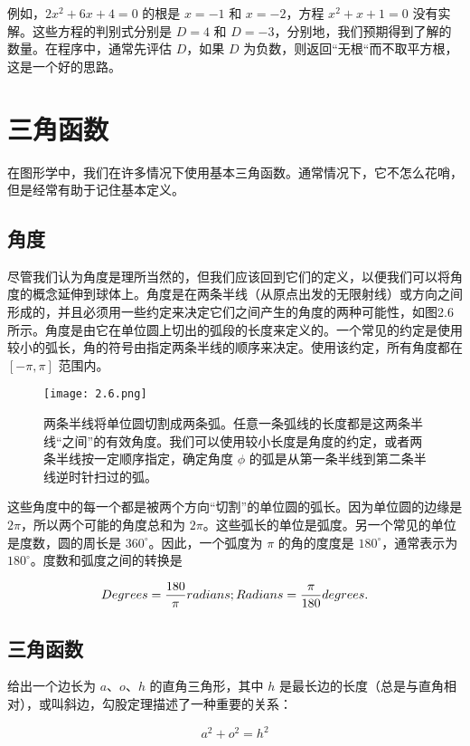\documentclass[lang=cn,10pt]{elegantbook}
\begin{document}
例如，$2x^2+6x+4=0$ 的根是 $x=-1$ 和 $x=-2$，方程 $x^2+x+1=0$ 没有实解。这些方程的判别式分别是 $D=4$ 和 $D=-3$，分别地，我们预期得到了解的数量。在程序中，通常先评估 $D$，如果 $D$ 为负数，则返回``无根“而不取平方根，这是一个好的思路。

\section{三角函数}

在图形学中，我们在许多情况下使用基本三角函数。通常情况下，它不怎么花哨，但是经常有助于记住基本定义。

\subsection{角度}

尽管我们认为角度是理所当然的，但我们应该回到它们的定义，以便我们可以将角度的概念延伸到球体上。角度是在两条半线（从原点出发的无限射线）或方向之间形成的，并且必须用一些约定来决定它们之间产生的角度的两种可能性，如图2.6所示。角度是由它在单位圆上切出的弧段的长度来定义的。一个常见的约定是使用较小的弧长，角的符号由指定两条半线的顺序来决定。使用该约定，所有角度都在 $[-\pi, \pi]$ 范围内。

\begin{figure}[htbp]
\centering
\texttt{[image: 2.6.png]}
\caption{两条半线将单位圆切割成两条弧。任意一条弧线的长度都是这两条半线“之间”的有效角度。我们可以使用较小长度是角度的约定，或者两条半线按一定顺序指定，确定角度 $\phi$ 的弧是从第一条半线到第二条半线逆时针扫过的弧。}
\end{figure}

这些角度中的每一个都是被两个方向“切割”的单位圆的弧长。因为单位圆的边缘是 $2\pi$，所以两个可能的角度总和为 $2\pi$。这些弧长的单位是弧度。另一个常见的单位是度数，圆的周长是 $360^\circ$。因此，一个弧度为 $\pi$ 的角的度度是 $180^\circ$，通常表示为 $180^\circ$。度数和弧度之间的转换是

$$
Degrees =\frac{180}{\pi} radians; \\
Radians =\frac{\pi}{180} degrees.
$$

\subsection{三角函数}

给出一个边长为 $a$、$o$、$h$ 的直角三角形，其中 $h$ 是最长边的长度（总是与直角相对），或叫斜边，勾股定理描述了一种重要的关系：

$$
a^2+o^2=h^2
$$
\end{document}
